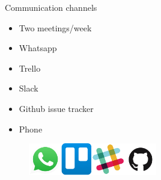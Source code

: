 \begin{frame}{Communication channels}
	\begin{itemize}
		\item Two meetings/week
		\item Whatsapp
		\item Trello
		\item Slack
		\item Github issue tracker
		\item Phone
	\end{itemize}

	\begin{figure}[htbp]
  		\centering
  		\includegraphics[width=0.5\textwidth]{figures/channels}
	\end{figure}
\end{frame}